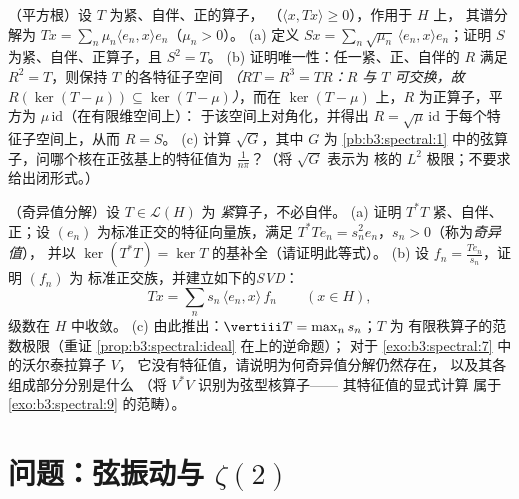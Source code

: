 \begin{exercise}[$\star\star$]\label{exo:b3:spectral:11}
（平方根）设 $T$ 为紧、自伴、正的算子，
（$\langle x, Tx\rangle \geq 0$），作用于 $H$ 上，
其谱分解为 $Tx = \sum_n\mu_n\langle e_n,
x\rangle e_n$（$\mu_n > 0$）。
(a) 定义 $Sx = \sum_n\sqrt{\mu_n}\,\langle e_n, x\rangle
e_n$；证明 $S$ 为紧、自伴、正算子，且 $S^2
= T$。
(b) 证明唯一性：任一紧、正、自伴的 $R$
满足 $R^2 = T$，则保持 $T$ 的各特征子空间
\emph{（$RT = R^3 = TR$：$R$ 与 $T$ 可交换，故
$R(\ker(T - \mu)) \subseteq \ker(T - \mu)$）}，而在
$\ker(T - \mu)$ 上，$R$ 为正算子，平方为
$\mu\,\mathrm{id}$（在有限维空间上）：
于该空间上对角化，并得出 $R =
\sqrt\mu\,\mathrm{id}$ 于每个特征子空间上，从而 $R = S$。
(c) 计算 $\sqrt G$，其中 $G$ 为
\cref{pb:b3:spectral:1} 中的弦算子，问哪个核在正弦基上的特征值为
$\frac1{n\pi}$？（将 $\sqrt G$ 表示为
核的 $L^2$ 极限；不要求给出闭形式。）
\end{exercise}

\begin{exercise}[$\star\star\star$]\label{exo:b3:spectral:12}
（奇异值分解）设 $T \in \mathcal L(H)$ 为
\emph{紧}算子，不必自伴。
(a) 证明 $T^*T$ 紧、自伴、正；设
$(e_n)$ 为标准正交的特征向量族，满足
$T^*Te_n = s_n^2e_n$，$s_n > 0$（称为\emph{奇异值}），
并以 $\ker(T^*T) = \ker T$ 的基补全（请证明此等式）。
(b) 设 $f_n = \frac{Te_n}{s_n}$，证明 $(f_n)$ 为
标准正交族，并建立如下的\emph{SVD}：
\[
Tx = \sum_n s_n\,\langle e_n, x\rangle\,f_n
\qquad (x \in H),
\]
级数在 $H$ 中收敛。
(c) 由此推出：$\vertiii T = \max_ns_n$；$T$ 为
有限秩算子的范数极限（重证
\cref{prop:b3:spectral:ideal} 在上的逆命题）；
对于 \cref{exo:b3:spectral:7} 中的沃尔泰拉算子 $V$，
它没有特征值，请说明为何奇异值分解仍然存在，
以及其各组成部分分别是什么
（将 $V^*V$ 识别为弦型核算子——
其特征值的显式计算
属于 \cref{exo:b3:spectral:9} 的范畴）。
\end{exercise}

\section{问题：弦振动与
\texorpdfstring{$\zeta(2)$}{zeta(2)}}

